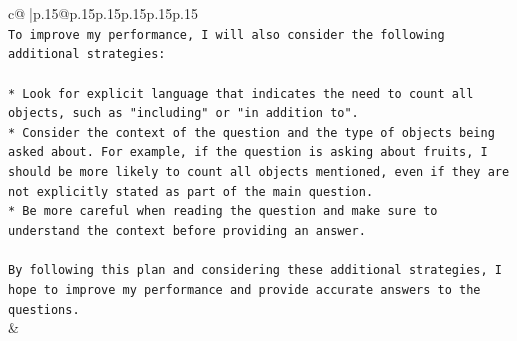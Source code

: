 \documentclass{article}
\begin{document}
{\begin{supertabular}{c@{$\;$}|p{.15\linewidth}@{}p{.15\linewidth}p{.15\linewidth}p{.15\linewidth}p{.15\linewidth}p{.15\linewidth}}
{{{\\ 
\texttt{To improve my performance, I will also consider the following additional strategies:} \\
\\ 
\texttt{* Look for explicit language that indicates the need to count all objects, such as "including" or "in addition to".} \\
\texttt{* Consider the context of the question and the type of objects being asked about. For example, if the question is asking about fruits, I should be more likely to count all objects mentioned, even if they are not explicitly stated as part of the main question.} \\
\texttt{* Be more careful when reading the question and make sure to understand the context before providing an answer.} \\
\\ 
\texttt{By following this plan and considering these additional strategies, I hope to improve my performance and provide accurate answers to the questions.} \\
            }
        }
    }
    & \\ \\

\end{supertabular}
}
\end{document}
